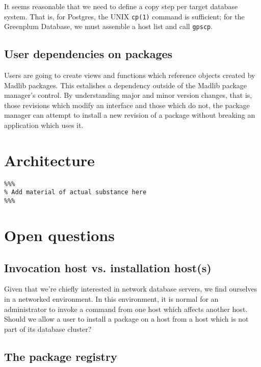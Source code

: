 \documentclass[11pt]{article}
\begin{document}
{	It seems reasonable that we need to define a copy step per target database
	system. That is, for Postgres, the UNIX \texttt{cp(1)} command is
	sufficient; for the Greenplum Database, we must assemble a host list and
	call \texttt{gpscp}.

	\subsection{User dependencies on packages}

	Users are going to create views and functions which reference objects
	created by Madlib packages. This estalishes a dependency outside of the
	Madlib package manager's control. By understanding major and minor version
	changes, that is, those revisions which modify an interface and those which
	do not, the package manager can attempt to install a new revision of a
	package without breaking an application which uses it.

\section{Architecture}

\begin{verbatim}
%%%
% Add material of actual substance here
%%%
\end{verbatim}

\ifx\pdfoutput\undefined %
\else
{}
\fi
\section{Open questions}
	
	\subsection{Invocation host vs. installation host(s)}

	Given that we're chiefly interested in network database servers, we find
	ourselves in a networked environment. In this environment, it is normal for
	an administrator to invoke a command from one host which affects another
	host. Should we allow a user to install a package on a host from a host
	which is not part of its database cluster?

	\subsection{The package registry}

}
\end{document}
